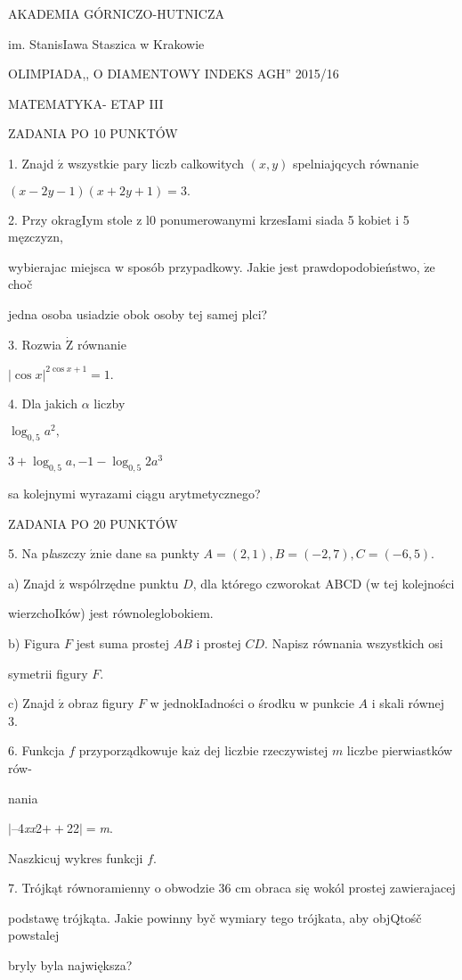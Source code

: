 \documentclass[a4paper,12pt]{article}
\begin{document}
AKADEMIA GÓRNICZO-HUTNICZA

im. StanisIawa Staszica w Krakowie

OLIMPIADA,, O DIAMENTOWY INDEKS AGH'' 2015/16

MATEMATYKA- ETAP III

ZADANIA PO 10 PUNKTÓW

1. Znajd $\acute{\mathrm{z}}$ wszystkie pary liczb calkowitych $(x,y)$ spelniajqcych równanie

$(x-2y-1)(x+2y+1)=3.$

2. Przy okragIym stole z l0 ponumerowanymi krzesIami siada 5 kobiet i 5 męzczyzn,

wybierajac miejsca w sposób przypadkowy. Jakie jest prawdopodobieństwo, $\dot{\mathrm{z}}\mathrm{e}$ choč

jedna osoba usiadzie obok osoby tej samej plci?

3. Rozwia $\dot{\mathrm{Z}}$ równanie

$|\cos x|^{2\cos x+1}=1.$

4. Dla jakich $\alpha$ liczby

$\log_{0,5}a^{2},$

$3+\log_{0,5}a, -1-\log_{0,5}2a^{3}$

sa kolejnymi wyrazami ciągu arytmetycznego?

ZADANIA PO 20 PUNKTÓW

5. Na p{\it l}aszczy $\acute{\mathrm{z}}\mathrm{n}\mathrm{i}\mathrm{e}$ dane sa punkty $A=(2,1), B=(-2,7), C=(-6,5).$

a) Znajd $\acute{\mathrm{z}}$ wspólrzędne punktu $D$, dla którego czworokat ABCD (w tej kolejności

wierzchoIków) jest równoleglobokiem.

b) Figura $F$ jest suma prostej $AB$ i prostej $CD$. Napisz równania wszystkich osi

symetrii figury $F.$

c) Znajd $\acute{\mathrm{z}}$ obraz figury $F$ w jednokIadności o środku w punkcie $A$ i skali równej 3.

6. Funkcja $f$ przyporządkowuje $\mathrm{k}\mathrm{a}\dot{\mathrm{z}}$ dej liczbie rzeczywistej $m$ liczbe pierwiastków rów-

nania

$|$--4{\it xx}2$++$22$|=${\it m}.

Naszkicuj wykres funkcji $f.$

7. Trójkąt równoramienny o obwodzie 36 cm obraca się wokól prostej zawierajacej

podstawę trójkąta. Jakie powinny byč wymiary tego trójkata, aby objQtośč powstalej

bryly byla największa?
\end{document}

